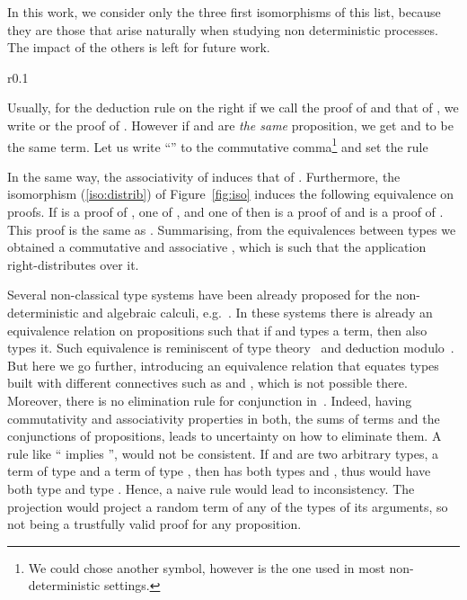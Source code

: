 \documentclass[final,copyright,creativecommons]{eptcs}
\theoremstyle{definition}
\begin{document}
In this work, we consider only the three first isomorphisms of this list,
because they are those that arise naturally when studying non deterministic
processes. The impact of the others is left for future work.

\begin{wrapfigure}{r}{0.1\textwidth}\vspace{-0.7cm}

\end{wrapfigure}Usually, for the deduction rule on the right
if we call  the proof of  and  that of , we write  or  the proof of . However if  and  are {\em the same} proposition, we get  and  to be the same term. Let us write ``'' to the commutative comma\footnote{We could chose another symbol, however  is the one used in most non-deterministic settings.} and set the rule


In the same way, the associativity of  induces that of .
Furthermore, the isomorphism (\ref{iso:distrib}) of Figure~\ref{fig:iso} induces the following equivalence on proofs. If  is a proof of ,  one of , and  one of  then  is a proof of  and  is a proof of . This proof is the same as .
Summarising, from the equivalences between types we obtained a commutative and associative , which is such that the application right-distributes over it.

Several non-classical type systems have been already proposed for the non-deterministic and algebraic calculi, e.g.~\cite{ArrighiDiazcaroLMCS12,ArrighiDiazcaroValironDCM11,DiazcaroPetitWoLLIC12}. In these systems there is already an equivalence relation on propositions such that if  and  types a term, then also  types it. Such equivalence is reminiscent of type theory~\cite{CoquandHuetIC88,MartinLof84} and deduction modulo~\cite{DowekHardinKirchnerJAR03,DowekWernerJSL98}. But here we go further, introducing an equivalence relation that equates types built with different connectives such as  and , which is not possible there.
Moreover, there is no elimination rule for conjunction in~\cite{ArrighiDiazcaroLMCS12,ArrighiDiazcaroValironDCM11,DiazcaroPetitWoLLIC12}. Indeed, having commutativity and associativity properties in both, the sums of terms and the conjunctions of propositions, leads to uncertainty on how to eliminate them. A rule like
`` implies '',
would not be consistent.
If  and  are two arbitrary types,  a term of type  and  a term of type , then  has both types  and , thus  would have both type  and type .
Hence, a naive rule would lead to inconsistency. The projection would project a random term of any of the types of its arguments, so not being a trustfully valid proof for any proposition.
\end{document}
